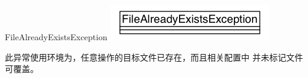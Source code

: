 \begin{XeClass}{FileAlreadyExistsException}
\includegraphics[width=\textwidth]{cdig/FileAlreadyExistsException.png}
     
 此异常使用环境为，任意操作的目标文件已存在，而且相关配置中
 并未标记文件可覆盖。

\end{XeClass}
